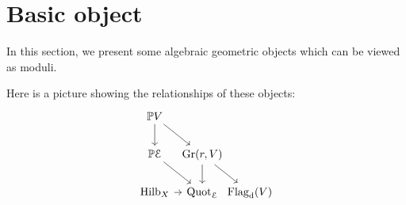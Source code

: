 \section{Basic object}
In this section, we present some algebraic geometric objects which can be viewed as moduli.

Here is a picture showing the relationships of these objects:
\[\begin{tikzcd}[row sep={12mm,between origins}, column sep={15mm,between origins}]
\mathbb{P}V \arrow[d] \arrow[rd] &                                 &           \\
\mathbb{P}\mathcal{E} \arrow[rd] & {\Gr(r,V)} \arrow[d] \arrow[rd] &           \\
\Hilb_X \arrow[r]                  & \Quot_{\mathcal{E}}                           & \Flagd(V)
\end{tikzcd}\]
